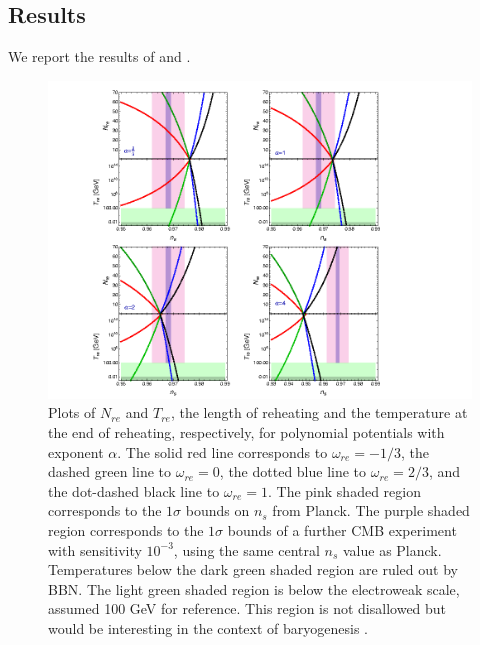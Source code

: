 \documentclass[11pt,a4paper,twoside]{book}
\begin{document}
\subsection{Results}
We report the results of \cite{Chap3:Cook} and \cite{Chap3:Kai_Kamionkowsy}.
\begin{figure} [h]
	\centering
	\includegraphics[width=1\linewidth, height=0.3\textheight]{Images/Chap3/Cook_Fig.2}
	\caption{Plots of $ N_{re} $ and $ T_{re} $, the length of reheating and the temperature at the end of reheating, respectively, for polynomial potentials with exponent $\alpha$. The solid red line corresponds to $ \omega_{re}=-1/3 $, the dashed green line to $\omega_{re}=0$, the dotted blue line to $ \omega_{re}=2/3 $, and the dot-dashed black line to $\omega_{re}=1$. The pink shaded region corresponds to the $ 1\sigma $ bounds on $ n_{s} $ from Planck. The purple shaded region corresponds to the $ 1\sigma $ bounds of a further CMB experiment with sensitivity $ 10^{-3} $, using the same central $ n_{s} $ value as Planck. Temperatures below the dark green shaded region are ruled out by BBN. The light green shaded region is below the electroweak scale, assumed 100 GeV for reference. This region is not disallowed but would be interesting in the context of baryogenesis \cite{Chap3:Cook}. }
	\label{fig:cookfig}
\end{figure}
\end{document}
